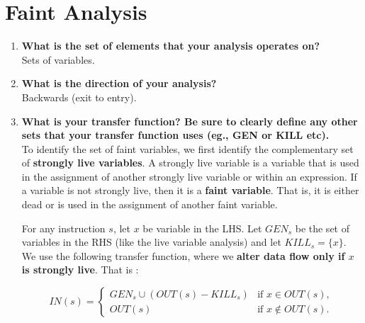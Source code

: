 \section{Faint Analysis}

\begin{enumerate}
\item \textbf{What is the set of elements that your analysis operates on?} \\

  Sets of variables.

\item \textbf{What is the direction of your analysis?} \\

  Backwards (exit to entry).

\item \textbf{What is your transfer function? Be sure to clearly define any other sets that your transfer function uses (eg., GEN or KILL etc).} \\

  To identify the set of faint variables, we first identify the complementary set of \textbf{strongly live variables}.
  A strongly live variable is a variable that is used in the assignment of another strongly live variable or within an expression.
  If a variable is not strongly live, then it is a \textbf{faint variable}.
  That is, it is either dead or is used in the assignment of another faint variable.


  For any instruction $s$, let $x$ be variable in the LHS. Let $GEN_s$ be the set of variables in the RHS (like the live variable analysis) and let $KILL_s = \{x\}$. We use the following transfer function, where we \textbf{alter data flow only if $x$ is strongly live}. That is :

\[
IN(s) = \left\{ 
\begin{array}{ll}
GEN_s \cup (OUT(s)-KILL_s) & \mbox{if } x \in OUT(s),\\
OUT(s) & \mbox{if } x \notin OUT(s).
\end{array}
\right.
\]


\end{enumerate}
